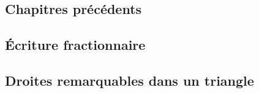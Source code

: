 

\subsection{Chapitres précédents}


\subsection{Écriture fractionnaire}


\subsection{Droites remarquables dans un triangle}


